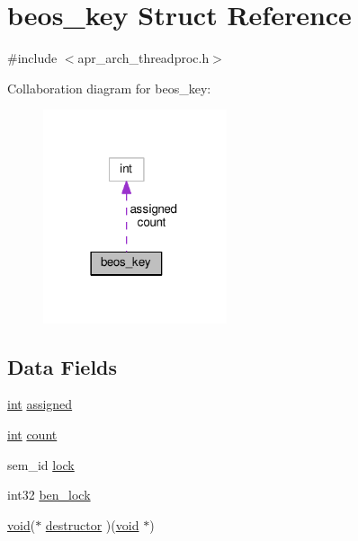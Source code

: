 \hypertarget{structbeos__key}{}\section{beos\+\_\+key Struct Reference}
\label{structbeos__key}


{\ttfamily \#include $<$apr\+\_\+arch\+\_\+threadproc.\+h$>$}



Collaboration diagram for beos\+\_\+key\+:
\nopagebreak
\begin{figure}[H]
\begin{center}
\leavevmode
\includegraphics[width=153pt]{structbeos__key__coll__graph}
\end{center}
\end{figure}
\subsection*{Data Fields}
\begin{DoxyCompactItemize}
\item 
\hyperlink{pcre_8txt_a42dfa4ff673c82d8efe7144098fbc198}{int} \hyperlink{structbeos__key_ab0c09ebde0e90dba52fcdd4675f2efcf}{assigned}
\item 
\hyperlink{pcre_8txt_a42dfa4ff673c82d8efe7144098fbc198}{int} \hyperlink{structbeos__key_a9a8f0ecaf460a97d7833e5abf5418be9}{count}
\item 
sem\+\_\+id \hyperlink{structbeos__key_ae0f8c79e5147e810cf89271970fc1c89}{lock}
\item 
int32 \hyperlink{structbeos__key_a9efd8d597bb9f74f5e522c7d9a2a5941}{ben\+\_\+lock}
\item 
\hyperlink{group__MOD__ISAPI_gacd6cdbf73df3d9eed42fa493d9b621a6}{void}($\ast$ \hyperlink{structbeos__key_a04bc9158e2c7c4145f68c8fcebfccc0a}{destructor} )(\hyperlink{group__MOD__ISAPI_gacd6cdbf73df3d9eed42fa493d9b621a6}{void} $\ast$)
\end{DoxyCompactItemize}


